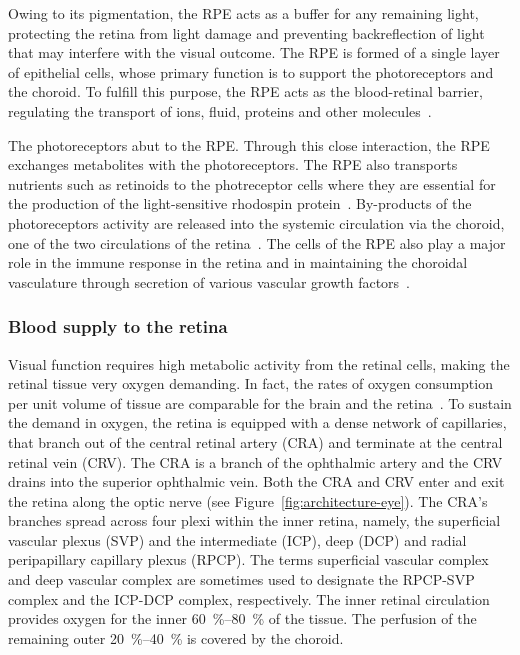 \documentclass{article}
\begin{document}
Owing to its pigmentation, the RPE acts as a buffer for any remaining light, protecting the retina from light damage and preventing backreflection of light that may interfere with the visual outcome.
The RPE is formed of a single layer of epithelial cells, whose primary function is to support the photoreceptors and the choroid.
To fulfill this purpose, the RPE acts as the blood-retinal barrier, regulating the transport of ions, fluid, proteins and other molecules~\cite{Boulton_2001}.

The photoreceptors abut to the RPE.
Through this close interaction, the RPE exchanges metabolites with the photoreceptors.
The RPE also transports nutrients such as retinoids to the photreceptor cells where they are essential for the production of the light-sensitive rhodospin protein~\cite{Boulton_2001}.
By-products of the photoreceptors activity are released into the systemic circulation via the choroid, one of the two circulations of the retina~\cite{Boulton_2001}.
The cells of the RPE also play a major role in the immune response in the retina and in maintaining the choroidal vasculature through secretion of various vascular growth factors~\cite{Boulton_2001,Detrick_2020}.

\subsubsection{Blood supply to the retina}

Visual function requires high metabolic activity from the retinal cells, making the retinal tissue very oxygen demanding.
In fact, the rates of oxygen consumption per unit volume of tissue are comparable for the brain and the retina~\cite{Medrano_1995}.
To sustain the demand in oxygen, the retina is equipped with a dense network of capillaries, that branch out of the central retinal artery (CRA) and terminate at the central retinal vein (CRV).
The CRA is a branch of the ophthalmic artery and the CRV drains into the superior ophthalmic vein.
Both the CRA and CRV enter and exit the retina along the optic nerve (see Figure~\ref{fig:architecture-eye}).
The CRA's branches spread across four plexi within the inner retina, namely, the superficial vascular plexus (SVP) and the intermediate (ICP), deep (DCP) and radial peripapillary capillary plexus (RPCP).
The terms superficial vascular complex and deep vascular complex are sometimes used to designate the RPCP-SVP complex and the ICP-DCP complex, respectively.
The inner retinal circulation provides oxygen for the inner \SIrange{60}{80}{\percent} of the tissue.
The perfusion of the remaining outer \SIrange{20}{40}{\percent} is covered by the choroid\cite{Birol_2007}.
\end{document}
